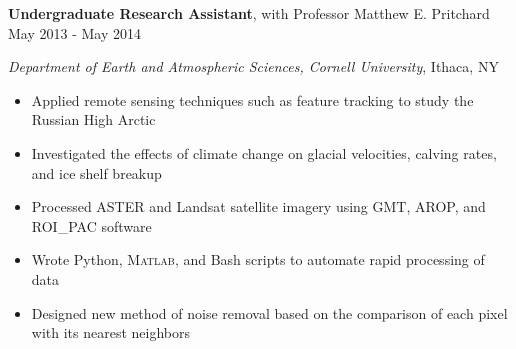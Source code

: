 
\textbf{Undergraduate Research Assistant}, with Professor Matthew E. Pritchard \hfill May 2013 - May 2014

\textit{Department of Earth and Atmospheric Sciences, Cornell University}, Ithaca, NY

\begin{itemize}
    \item Applied remote sensing techniques such as feature tracking to study the Russian High Arctic
    \item Investigated the effects of climate change on glacial velocities, calving rates, and ice shelf breakup
    \item Processed ASTER and Landsat satellite imagery using GMT, AROP, and ROI\_PAC software
    \item Wrote Python, \textsc{Matlab}, and Bash scripts to automate rapid processing of data
    \item Designed new method of noise removal based on the comparison of each pixel with its nearest neighbors
\end{itemize}
